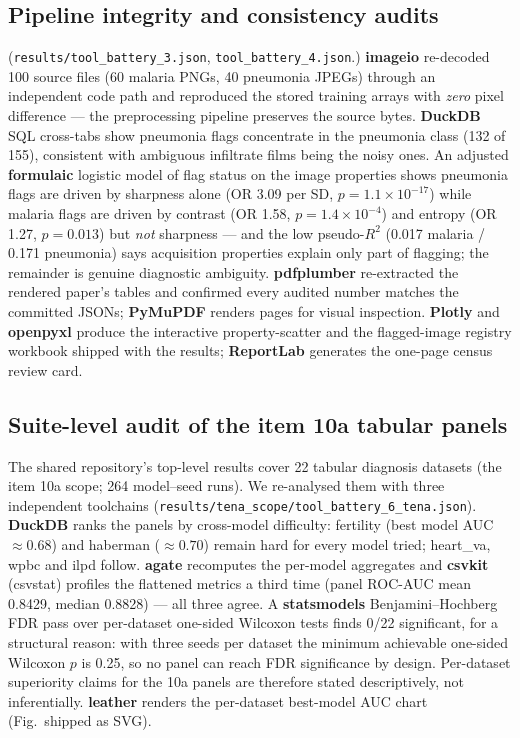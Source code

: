 \documentclass[11pt]{article}
\theoremstyle{definition}
\begin{document}
\subsection{Pipeline integrity and consistency audits}
(\texttt{results/tool\_battery\_3.json}, \texttt{tool\_battery\_4.json}.)
\textbf{imageio} re-decoded 100 source files (60 malaria PNGs, 40
pneumonia JPEGs) through an independent code path and reproduced the
stored training arrays with \emph{zero} pixel difference --- the
preprocessing pipeline preserves the source bytes. \textbf{DuckDB} SQL
cross-tabs show pneumonia flags concentrate in the pneumonia class
(132 of 155), consistent with ambiguous infiltrate films being the noisy
ones. An adjusted \textbf{formulaic} logistic model of flag status on
the image properties shows pneumonia flags are driven by sharpness alone
(OR 3.09 per SD, $p{=}1.1{\times}10^{-17}$) while malaria flags are
driven by contrast (OR 1.58, $p{=}1.4{\times}10^{-4}$) and entropy
(OR 1.27, $p{=}0.013$) but \emph{not} sharpness --- and the low
pseudo-$R^2$ (0.017 malaria / 0.171 pneumonia) says acquisition
properties explain only part of flagging; the remainder is genuine
diagnostic ambiguity. \textbf{pdfplumber} re-extracted the rendered
paper's tables and confirmed every audited number matches the committed
JSONs; \textbf{PyMuPDF} renders pages for visual inspection.
\textbf{Plotly} and \textbf{openpyxl} produce the interactive
property-scatter and the flagged-image registry workbook shipped with
the results; \textbf{ReportLab} generates the one-page census review
card.

\subsection{Suite-level audit of the item 10a tabular panels}
The shared repository's top-level results cover 22 tabular diagnosis
datasets (the item 10a scope; 264 model--seed runs). We re-analysed them
with three independent toolchains
(\texttt{results/tena\_scope/tool\_battery\_6\_tena.json}).
\textbf{DuckDB} ranks the panels by cross-model difficulty: fertility
(best model AUC $\approx 0.68$) and haberman ($\approx 0.70$) remain
hard for every model tried; heart\_va, wpbc and ilpd follow.
\textbf{agate} recomputes the per-model aggregates and \textbf{csvkit}
(csvstat) profiles the flattened metrics a third time (panel ROC-AUC
mean 0.8429, median 0.8828) --- all three agree. A \textbf{statsmodels}
Benjamini--Hochberg FDR pass over per-dataset one-sided Wilcoxon tests
finds 0/22 significant, for a structural reason: with three seeds per
dataset the minimum achievable one-sided Wilcoxon $p$ is 0.25, so no
panel can reach FDR significance by design. Per-dataset superiority
claims for the 10a panels are therefore stated descriptively, not
inferentially. \textbf{leather} renders the per-dataset best-model AUC
chart (Fig.\ shipped as SVG).
\end{document}
